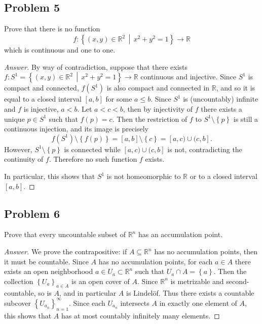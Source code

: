 \documentclass[12pt]{article}
\newcommand{\real}{\mathbb{R}}
\newcommand\paren[1]{\left( #1 \right)}
\newcommand\setb[1]{\left \{ #1 \right \}}
\theoremstyle{definition}
\begin{document}
\subsection{Problem 5}
Prove that there is no function
\[
    f : \setb{ (x,y) \in \real^2 \, \middle| \, x^2 + y^2 = 1 } \to \real
\]
which is continuous and one to one.
\begin{proof}[Answer]
    By way of contradiction, suppose that there exists $f : S^1 = \setb{ (x,y) \in \real^2 \, \middle| \, x^2 + y^2 = 1 } \to \real$ continuous and injective. Since $S^1$ is compact and connected, $f(S^1)$ is also compact and connected in $\real$, and so it is equal to a closed interval $[a,b]$ for some $a \leq b$. Since $S^1$ is (uncountably) infinite and $f$ is injective, $a < b$. Let $a < c < b$, then by injectivity of $f$ there exists a unique $p \in S^1$ such that $f(p) = c$. Then the restriction of $f$ to $S^1 \setminus \setb{ p }$ is still a continuous injection, and its image is precisely 
    \[
        f \paren{ S^1 } \setminus \setb{ f(p) } = [a,b] \setminus \setb{ c } = [a,c) \cup (c,b].
    \]
    However, $S^1 \setminus \setb{ p }$ is connected while $[a,c) \cup (c,b]$ is not, contradicting the continuity of $f$. Therefore no such function $f$ exists.
    
    In particular, this shows that $S^1$ is not homeomorphic to $\real$ or to a closed interval $[a,b]$.
\end{proof}
\subsection{Problem 6}
Prove that every uncountable subset of $\real^n$ has an accumulation point.
\begin{proof}[Answer]
    We prove the contrapositive: if $A \subseteq \real^n$ has no accumulation points, then it must be countable. Since $A$ has no accumulation points, for each $a \in A$ there exists an open neighborhood $a \in U_a \subset \real^n$ such that $U_a \cap A = \setb{ a }$. Then the collection $\setb{ U_a }_{a \in A}$ is an open cover of $A$. Since $\real^n$ is metrizable and second-countable, so is $A$, and in particular $A$ is Lindel\"of. Thus there exists a countable subcover $\setb{ U_{a_n} }_{n = 1}^{\infty}$. Since each $U_{a_n}$ intersects $A$ in exactly one element of $A$, this shows that $A$ has at most countably infinitely many elements. 
\end{proof}
\end{document}
